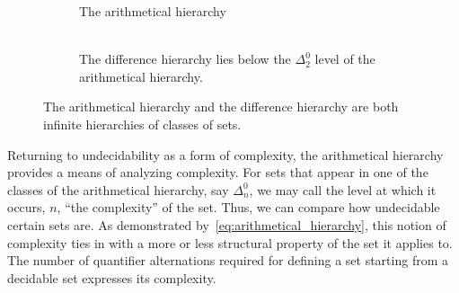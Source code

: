 \begin{figure}
  \centering
  \begin{subfigure}{0.4\textwidth}
    \centering
    \caption{
      The arithmetical hierarchy
      \\\hspace{0pt} \\\hspace{0pt} %
    }
    \label{fig:arithmetical_hierarchy}
  \end{subfigure}
  \qquad
  \begin{subfigure}{0.4\textwidth}
    \centering
    \caption{
      The difference hierarchy lies below the $\Delta^0_2$ level of the arithmetical hierarchy.
    }
    \label{fig:difference_hierarchy}
  \end{subfigure}
  \caption{
    The arithmetical hierarchy and the difference hierarchy are both infinite hierarchies of classes of sets.
  }
\end{figure}

Returning to undecidability as a form of complexity, the arithmetical hierarchy provides a means of analyzing complexity.
For sets that appear in one of the classes of the arithmetical hierarchy, say $\Delta^0_n$, we may call the level at which it occurs, $n$, \enquote{the complexity} of the set.
Thus, we can compare how undecidable certain sets are.
As demonstrated by~\eqref{eq:arithmetical_hierarchy}, this notion of complexity ties in with a more or less structural property of the set it applies to.
The number of quantifier alternations required for defining a set starting from a decidable set expresses its complexity.

